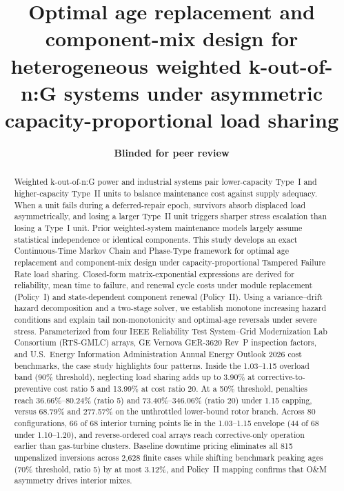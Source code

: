 \documentclass{elektr}
\title{Optimal age replacement and component-mix design for heterogeneous weighted k-out-of-n:G systems under asymmetric capacity-proportional load sharing}
\author[Anonymous]{
	\textbf{Blinded for peer review}
}
\begin{document}
\maketitle

\begin{abstract}Weighted k-out-of-n:G power and industrial systems pair lower-capacity Type~I and higher-capacity Type~II units to balance maintenance cost against supply adequacy. When a unit fails during a deferred-repair epoch, survivors absorb displaced load asymmetrically, and losing a larger Type~II unit triggers sharper stress escalation than losing a Type~I unit. Prior weighted-system maintenance models largely assume statistical independence or identical components. This study develops an exact Continuous-Time Markov Chain and Phase-Type framework for optimal age replacement and component-mix design under capacity-proportional Tampered Failure Rate load sharing. Closed-form matrix-exponential expressions are derived for reliability, mean time to failure, and renewal cycle costs under module replacement (Policy~I) and state-dependent component renewal (Policy~II). Using a variance--drift hazard decomposition and a two-stage solver, we establish monotone increasing hazard conditions and explain tail non-monotonicity and optimal-age reversals under severe stress. Parameterized from four IEEE Reliability Test System--Grid Modernization Lab Consortium (RTS-GMLC) arrays, GE Vernova GER-3620 Rev~P inspection factors, and U.S.\ Energy Information Administration Annual Energy Outlook 2026 cost benchmarks, the case study highlights four patterns. Inside the 1.03--1.15 overload band (90\% threshold), neglecting load sharing adds up to 3.90\% at corrective-to-preventive cost ratio 5 and 13.99\% at cost ratio 20. At a 50\% threshold, penalties reach 36.66\%--80.24\% (ratio 5) and 73.40\%--346.06\% (ratio 20) under 1.15 capping, versus 68.79\% and 277.57\% on the unthrottled lower-bound rotor branch. Across 80 configurations, 66 of 68 interior turning points lie in the 1.03--1.15 envelope (44 of 68 under 1.10--1.20), and reverse-ordered coal arrays reach corrective-only operation earlier than gas-turbine clusters. Baseline downtime pricing eliminates all 815 unpenalized inversions across 2,628 finite cases while shifting benchmark peaking ages (70\% threshold, ratio 5) by at most 3.12\%, and Policy~II mapping confirms that O\&M asymmetry drives interior mixes.

\end{abstract}
\end{document}
